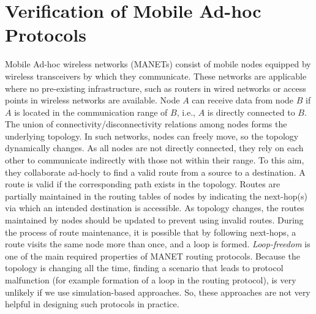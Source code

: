 \section{Verification of Mobile Ad-hoc Protocols}\label{sec::wrebeca} 
Mobile Ad-hoc wireless networks (MANETs) consist of mobile nodes equipped by wireless transceivers by which they communicate. These networks are applicable where no pre-existing infrastructure, such as routers in wired networks or access points in wireless networks 
are available.  
Node $A$ can receive data from  node $B$ if $A$ is located in the communication range of $B$, i.e., $A$ is directly connected to $B$. The union of connectivity/disconnectivity relations among nodes forms the underlying topology.  In such networks, nodes can freely move, so the %
topology dynamically changes. As all nodes are not directly connected, they rely on each other to communicate indirectly with those not within their range. To this aim, they collaborate ad-hocly to find a valid route from a source to a destination. A route is valid if the corresponding path exists in the topology. Routes are partially maintained in the routing tables of nodes by indicating the next-hop(s) via which an intended destination is accessible. As topology changes, the routes maintained by nodes should be updated to prevent using  invalid routes. %
During the process of route maintenance, it is possible that by following next-hops, a route visits the same node more than once, and a loop is formed. 
\emph{Loop-freedom} is one of the main required properties of MANET routing protocols. Because the topology is changing all the time, finding a scenario that leads to protocol malfunction (for example  formation of a loop in the routing protocol), is very unlikely if we use  simulation-based approaches. So, these approaches are not very helpful in designing such protocols in practice. 


